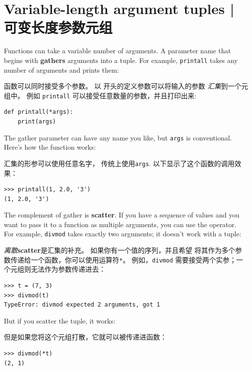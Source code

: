 \section{Variable-length argument tuples | 可变长度参数元组}
\label{gather}
 
  

Functions can take a variable number of arguments.  A parameter
name that begins with {\tt *} {\bf gathers} arguments into
a tuple.  For example, {\tt printall}
takes any number of arguments and prints them:

函数可以同时接受多个参数。 以 {\bf *} 开头的定义参数可以将输入的参数 \emph{汇集}到一个元组中。 例如 \lstinline{printall} 可以接受任意数量的参数，并且打印出来:

\begin{lstlisting}
def printall(*args):
    print(args)
\end{lstlisting}
%
The gather parameter can have any name you like, but {\tt args} is
conventional.  Here's how the function works:

汇集的形参可以使用任意名字， 传统上使用\lstinline{args}. 以下显示了这个函数的调用效果：

\begin{lstlisting}
>>> printall(1, 2.0, '3')
(1, 2.0, '3')
\end{lstlisting}
%
The complement of gather is {\bf scatter}.  If you have a
sequence of values and you want to pass it to a function
as multiple arguments, you can use the {\tt *} operator.
For example, {\tt divmod} takes exactly two arguments; it
doesn't work with a tuple:

\emph{离散}{\bf scatter}是汇集的补充。 如果你有一个值的序列，并且希望
将其作为多个参数传递给一个函数，你可以使用运算符\lstinline{*}。
例如，\lstinline{divmod} 需要接受两个实参；一个元组则无法作为参数传递进去：

  

\begin{lstlisting}
>>> t = (7, 3)
>>> divmod(t)
TypeError: divmod expected 2 arguments, got 1
\end{lstlisting}
%
But if you scatter the tuple, it works:

但是如果您将这个元组打散，它就可以被传递进函数：

\begin{lstlisting}
>>> divmod(*t)
(2, 1)
\end{lstlisting}

